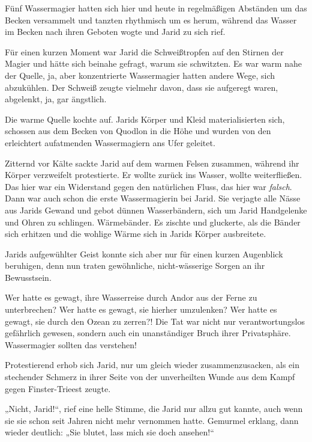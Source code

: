 Fünf Wassermagier hatten sich hier und heute in regelmäßigen Abständen um das Becken versammelt und tanzten rhythmisch um es herum, während das Wasser im Becken nach ihren Geboten wogte und Jarid zu sich rief.

Für einen kurzen Moment war Jarid die Schweißtropfen auf den Stirnen der Magier und hätte sich beinahe gefragt, warum sie schwitzten. Es war warm nahe der Quelle, ja, aber konzentrierte Wassermagier hatten andere Wege, sich abzukühlen. Der Schweiß zeugte vielmehr davon, dass sie aufgeregt waren, abgelenkt, ja, gar ängstlich.

Die warme Quelle kochte auf. Jarids Körper und Kleid materialisierten sich, schossen aus dem Becken von Quodlon in die Höhe und wurden von den erleichtert aufatmenden Wassermagiern ans Ufer geleitet.



\trennzeichen



Zitternd vor Kälte sackte Jarid auf dem warmen Felsen zusammen, während ihr Körper verzweifelt protestierte. Er wollte zurück ins Wasser, wollte weiterfließen. Das hier war ein Widerstand gegen den natürlichen Fluss, das hier war \textit{falsch}. Dann war auch schon die erste Wassermagierin bei Jarid. Sie verjagte alle Nässe aus Jarids Gewand und gebot dünnen Wasserbändern, sich um Jarid Handgelenke und Ohren zu schlingen. Wärmebänder. Es zischte und gluckerte, als die Bänder sich erhitzen und die wohlige Wärme sich in Jarids Körper ausbreitete.

Jarids aufgewühlter Geist konnte sich aber nur für einen kurzen Augenblick beruhigen, denn nun traten gewöhnliche, nicht-wässerige Sorgen an ihr Bewusstsein.

Wer hatte es gewagt, ihre Wasserreise durch Andor aus der Ferne zu unterbrechen? Wer hatte es gewagt, sie hierher umzulenken? Wer hatte es gewagt, sie durch den Ozean zu zerren?! Die Tat war nicht nur verantwortungslos gefährlich gewesen, sondern auch ein unanständiger Bruch ihrer Privatsphäre. Wassermagier sollten das verstehen!

Protestierend erhob sich Jarid, nur um gleich wieder zusammenzusacken, als ein stechender Schmerz in ihrer Seite von der unverheilten Wunde aus dem Kampf gegen Finster-Trieest zeugte.

„Nicht, Jarid!“, rief eine helle Stimme, die Jarid nur allzu gut kannte, auch wenn sie sie schon seit Jahren nicht mehr vernommen hatte. Gemurmel erklang, dann wieder deutlich: „Sie blutet, lass mich sie doch ansehen!“


